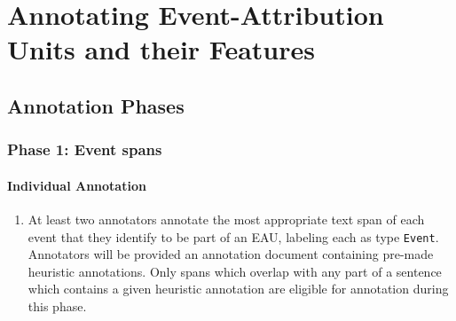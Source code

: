 \documentclass[a4paper,12pt]{article}
\begin{document}


\section{Annotating Event-Attribution Units and their Features}


    \subsection{Annotation Phases}
    \subsubsection{Phase 1: Event spans}
    \paragraph{Individual Annotation}
        \begin{enumerate}
            \item At least two annotators annotate the most appropriate text span of each event that they identify to be part of an EAU, labeling each as type \texttt{Event}. Annotators will be provided an annotation document containing pre-made heuristic annotations. Only spans which overlap with any part of a sentence which contains a given heuristic annotation are eligible for annotation during this phase. 
        \end{enumerate}
\end{document}
